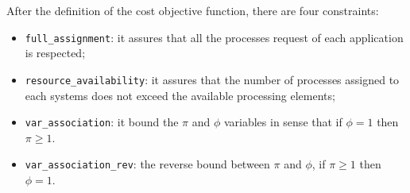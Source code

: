After the definition of the cost objective function, there are four
constraints:
\begin{itemize}
\item \texttt{full\_assignment}: it assures that all the processes request of
each application is respected;
\item \texttt{resource\_availability}: it assures that the number of processes
assigned to each systems does not exceed the available processing elements;
\item \texttt{var\_association}: it bound the \(\pi\) and \(\phi\) variables in
sense that if \(\phi=1\) then  \(\pi \ge 1 \).

\item \texttt{var\_association\_rev}: the reverse bound between \(\pi\) and
\(\phi\), if \(\pi \ge 1\) then  \(\phi = 1 \).

\end{itemize}


\lstset{%
}%

